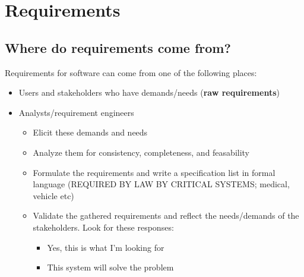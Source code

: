 \documentclass[12pt]{book}
\begin{document}
\newpage
\section*{Requirements}
\subsection*{Where do requirements come from?}
Requirements for software can come from one of the following places:
\begin{itemize}
  \item Users and stakeholders who have demands/needs (\textbf{raw requirements})
  \item Analysts/requirement engineers
  \begin{itemize}
    \item Elicit these demands and needs
    \item Analyze them for consistency, completeness, and feasability
    \item Formulate the requirements and write a specification list in formal language (REQUIRED BY LAW BY CRITICAL SYSTEMS; medical, vehicle etc)
    \item Validate the gathered requirements and reflect the needs/demands of the stakeholders. Look for these responses:
    \begin{itemize}
      \item Yes, this is what I'm looking for
      \item This system will solve the problem
    \end{itemize} 
  \end{itemize}
\end{itemize}
\end{document}
